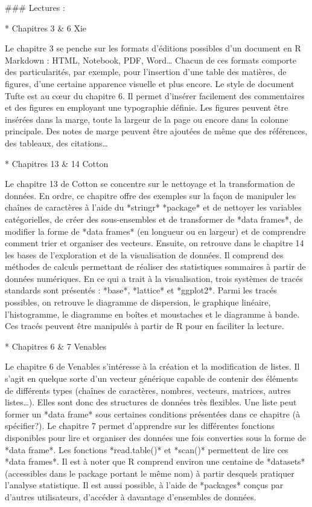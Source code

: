 \documentclass[
  letterpaper,
]{scrbook}
\begin{document}
\#\#\# Lectures :

* Chapitres 3 \& 6 Xie

Le chapitre 3 se penche sur les formats d'éditions possibles d'un
document en R Markdown : HTML, Notebook, PDF, Word\ldots{} Chacun de ces
formats comporte des particularités, par exemple, pour l'insertion d'une
table des matières, de figures, d'une certaine apparence visuelle et
plus encore. Le style de document Tufte est au cœur du chapitre 6. Il
permet d'insérer facilement des commentaires et des figures en employant
une typographie définie. Les figures peuvent être insérées dans la
marge, toute la largeur de la page ou encore dans la colonne principale.
Des notes de marge peuvent être ajoutées de même que des références, des
tableaux, des citations\ldots{}

* Chapitres 13 \& 14 Cotton

Le chapitre 13 de Cotton se concentre sur le nettoyage et la
transformation de données. En ordre, ce chapitre offre des exemples sur
la façon de manipuler les chaînes de caractères à l'aide du *stringr*
*package* et de nettoyer les variables catégorielles, de créer des
sous-ensembles et de transformer de *data frames*, de modifier la forme
de *data frames* (en longueur ou en largeur) et de comprendre comment
trier et organiser des vecteurs. Ensuite, on retrouve dans le chapitre
14 les bases de l'exploration et de la visualisation de données. Il
comprend des méthodes de calculs permettant de réaliser des statistiques
sommaires à partir de données numériques. En ce qui a trait à la
visualisation, trois systèmes de tracés standards sont présentés :
*base*, *lattice* et *ggplot2*. Parmi les tracés possibles, on retrouve
le diagramme de dispersion, le graphique linéaire, l'histogramme, le
diagramme en boîtes et moustaches et le diagramme à bande. Ces tracés
peuvent être manipulés à partir de R pour en faciliter la lecture.

* Chapitres 6 \& 7 Venables

Le chapitre 6 de Venables s'intéresse à la création et la modification
de listes. Il s'agit en quelque sorte d'un vecteur générique capable de
contenir des éléments de différents types (chaînes de caractères,
nombres, vecteurs, matrices, autres listes\ldots). Elles sont donc des
structures de données très flexibles. Une liste peut former un *data
frame* sous certaines conditions présentées dans ce chapitre (à
spécifier?). Le chapitre 7 permet d'apprendre sur les différentes
fonctions disponibles pour lire et organiser des données une fois
converties sous la forme de *data frame*. Les fonctions *read.table()*
et *scan()* permettent de lire ces *data frames*. Il est à noter que R
comprend environ une centaine de *datasets* (accessibles dans le package
portant le même nom) à partir desquels pratiquer l'analyse statistique.
Il est aussi possible, à l'aide de *packages* conçus par d'autres
utilisateurs, d'accéder à davantage d'ensembles de données.
\end{document}
